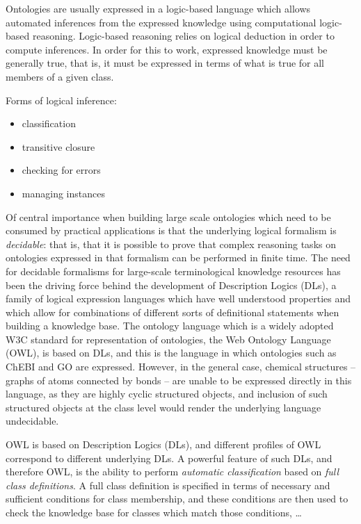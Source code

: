 \documentclass[10pt]{bmc_article}
\newenvironment{bmcformat}{\baselineskip20pt\sloppy\setboolean{publ}{false}}{\baselineskip20pt\sloppy}
\begin{document}
\begin{bmcformat}
 
Ontologies are usually expressed in a logic-based language which allows automated inferences from the expressed knowledge using computational logic-based reasoning.  Logic-based reasoning relies on logical deduction in order to compute inferences.  In order for this to work, expressed knowledge must be generally true, that is, it must be expressed in terms of what is true for all members of a given class. 

Forms of logical inference: 
\begin{itemize}
	\item  classification
	\item  transitive closure
	\item  checking for errors
	\item  managing instances
\end{itemize}

Of central importance when building large scale ontologies which need to be consumed by practical applications is that the underlying logical formalism is \textit{decidable}: that is, that it is possible to prove that complex reasoning tasks on ontologies expressed in that formalism can be performed in finite time.  The need for decidable formalisms for large-scale terminological knowledge resources has been the driving force behind the development of Description Logics (DLs), a family of logical expression languages which have well understood properties and which allow for combinations of different sorts of definitional statements when building a knowledge base.  The ontology language which is a widely adopted W3C standard for representation of ontologies, the Web Ontology Language (OWL), is based on DLs, and this is the language in which ontologies such as ChEBI and GO are expressed. However, in the general case, chemical structures -- graphs of atoms connected by bonds -- are unable to be expressed directly in this language, as they are highly cyclic structured objects, and inclusion of such structured objects at the class level would render the underlying language undecidable.   
 
OWL is based on Description Logics (DLs), and different profiles of OWL correspond to different underlying DLs.  A powerful feature of such DLs, and therefore OWL, is the ability to perform \textit{automatic classification} based on \textit{full class definitions}.  A full class definition is specified in terms of necessary and sufficient conditions for class membership, and these conditions are then used to check the knowledge base for classes which match those conditions, \ldots


\end{bmcformat}
\end{document}
